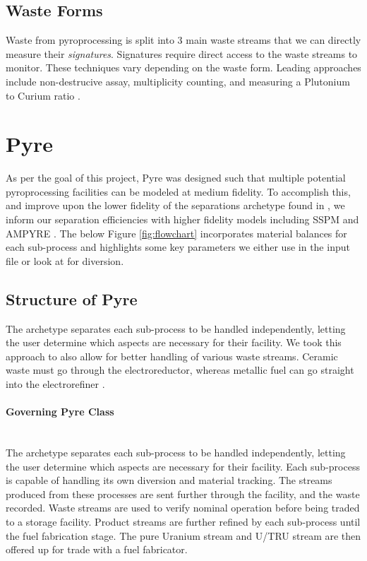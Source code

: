 \subsection{Waste Forms}

Waste from pyroprocessing is split into 3 main waste streams that we can directly measure their \emph{signatures}. Signatures require direct access to the waste streams to monitor.
These techniques vary depending on the waste form. Leading approaches include non-destrucive assay, multiplicity counting, and measuring a Plutonium to Curium ratio \cite{lee_determination_2012,noauthor_non-destructive_nodate}.

\section{Pyre}

As per the goal of this project, Pyre was designed such that multiple potential pyroprocessing facilities can be modeled at medium fidelity. To accomplish this, and improve upon
the lower fidelity of the separations archetype found in \Cycamore, we inform our separation efficiencies with higher fidelity models including SSPM and AMPYRE \cite{cipiti_modeling_2012,maggos_update_2015}. The below Figure \ref{fig:flowchart} incorporates material balances for each sub-process and highlights some key parameters we
either use in the input file or look at for diversion.

\subsection{Structure of Pyre}

The archetype separates each sub-process to be handled independently, letting the user determine which aspects are necessary for their facility. We took this approach to also
allow for better handling of various waste streams. Ceramic waste must go through the electroreductor, whereas metallic fuel can go straight into the electrorefiner \cite{michael_f._simpson_developments_2012}. 
\paragraph{Governing Pyre Class} \mbox{}\\
The archetype separates each sub-process to be handled independently, letting the user determine which aspects are necessary for their facility. Each sub-process is capable
of handling its own diversion and material tracking. The streams produced from these processes are sent further through the facility, and the waste recorded. Waste streams are
used to verify nominal operation before being traded to a storage facility. Product streams are further refined by each sub-process until the fuel fabrication stage.
The pure Uranium stream and U/TRU stream are then offered up for trade with a fuel fabricator.

